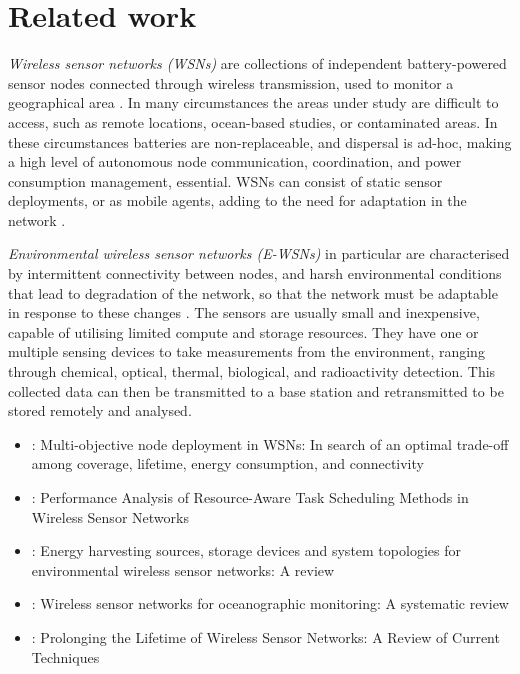 \section{Related work}
\label{section:background}
\textit{Wireless sensor networks (WSNs)} are collections of independent battery-powered sensor nodes connected through wireless transmission, used to monitor a geographical area \citep{Akyildiz,Yick2008a}. In many circumstances the areas under study are difficult to access, such as remote locations, ocean-based studies, or contaminated areas. In these circumstances batteries are non-replaceable, and dispersal is ad-hoc, making a high level of autonomous node communication, coordination, and power consumption management, essential. WSNs can consist of static sensor deployments, or as mobile agents, adding to the need for adaptation in the network \citep{ramasamy2017mobile, 4224091} .

\textit{Environmental wireless sensor networks (E-WSNs)} in particular are characterised by intermittent connectivity between nodes, and harsh environmental conditions that lead to degradation of the network, so that the network must be adaptable in response to these changes \citep{Oliveira2011}. The sensors are usually small and inexpensive, capable of utilising limited compute and storage resources. They have one or multiple sensing devices to take measurements from the environment, ranging through chemical, optical, thermal, biological, and radioactivity detection. This collected data can then be transmitted to a base station and retransmitted to be stored remotely and analysed.

\begin{itemize}
	\item \cite{Sengupta2013}: Multi-objective node deployment in WSNs: In search of an optimal trade-off among coverage, lifetime, energy consumption, and connectivity 
	
	
	\item  \cite{doi:10.1155/2014/765182}: Performance Analysis of Resource-Aware Task Scheduling Methods in Wireless Sensor Networks

	
	\item \cite{Prauzek2018}: Energy harvesting sources, storage devices and system topologies for environmental wireless sensor networks: A review
	
	
	\item \cite{Albaladejo2010}: Wireless sensor networks for oceanographic monitoring: A systematic review
	
	\item \cite{10.1155/2018/8035065}: Prolonging the Lifetime of Wireless Sensor Networks: A Review of Current Techniques
	
\end{itemize}